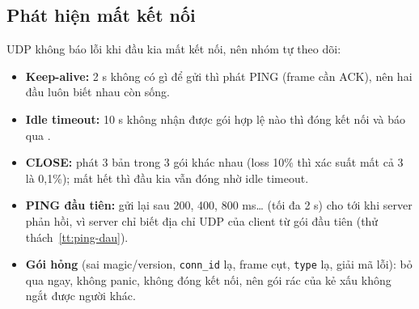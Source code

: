 \subsection{Phát hiện mất kết nối}
\label{subsec:song-chet}
UDP không báo lỗi khi đầu kia mất kết nối, nên nhóm tự theo dõi:
\begin{itemize}
  \item \textbf{Keep-alive:} 2 s không có gì để gửi thì phát PING (frame cần ACK), nên hai đầu luôn biết nhau còn
        sống.
  \item \textbf{Idle timeout:} 10 s không nhận được gói hợp lệ nào thì đóng kết nối và báo qua .
  \item \textbf{CLOSE:} phát 3 bản trong 3 gói khác nhau (loss 10\% thì xác suất mất cả 3 là 0,1\%); mất hết thì
        đầu kia vẫn đóng nhờ idle timeout.
  \item \textbf{PING đầu tiên:} gửi lại sau 200, 400, 800 ms\dots{} (tối đa 2 s) cho tới khi server phản hồi, vì
        server chỉ biết địa chỉ UDP của client từ gói đầu tiên (thử thách~\ref{tt:ping-dau}).
  \item \textbf{Gói hỏng} (sai magic/version, \texttt{conn\_id} lạ, frame cụt, \texttt{type} lạ, giải mã lỗi): bỏ
        qua ngay, không panic, không đóng kết nối, nên gói rác của kẻ xấu không ngắt được người khác.
\end{itemize}

